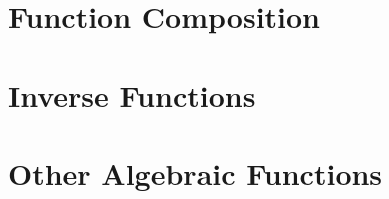 \section{Function Composition}



\newpage

\section{Inverse Functions}



\newpage

\section{Other Algebraic Functions}



